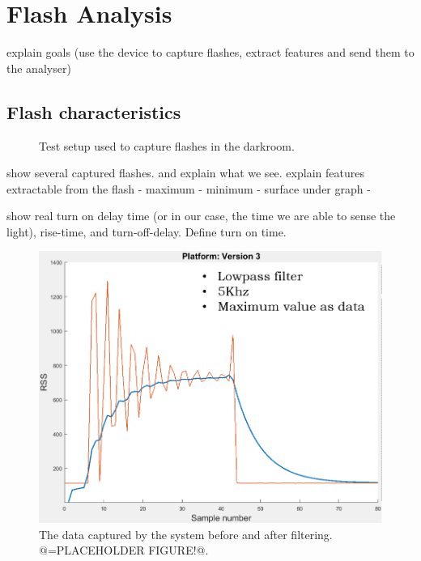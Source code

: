 \chapter{Flash Analysis}
\label{chp:Flash_Analysis}
explain goals (use the device to capture flashes, extract features and send them to the analyser)


\section{Flash characteristics}
\label{sec:Flash_characteristics}

\begin{figure}
	\centering     %
	\label{fig:Flashcapturing}
	\caption{Test setup used to capture flashes in the darkroom.}
\end{figure}

show several captured flashes. and explain what we see.
explain features extractable from the flash
 - maximum
 - minimum
 - surface under graph
 - 

show real turn on delay time (or in our case, the time we are able to sense the light), rise-time, and turn-off-delay.
Define turn on time.

\begin{figure}[!h]
	\includegraphics[width=\textwidth]{pics/66KhzFilter_placeholder.png}
	\caption{The data captured by the system before and after filtering. @=PLACEHOLDER FIGURE!@.}
	\label{fig:66KhzFilter}
\end{figure}

